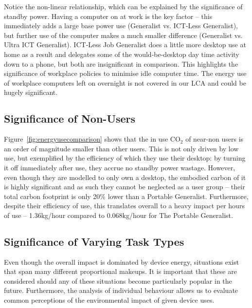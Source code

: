 \documentclass[conference]{IEEEtran}
\begin{document}
Notice the non-linear relationship, which can be
explained by the significance of standby power. Having a computer on
at work is the key factor -- this immediately adds a large base power
use (Generalist vs. ICT-Less Generalist), but further use of the
computer makes a much smaller difference (Generalist vs. Ultra ICT
Generalist). ICT-Less Job Generalist does a little more desktop use at
home as a result and delegates some of the would-be-desktop day time
activity down to a phone, but both are insignificant in
comparison. This highlights the significance of workplace policies to
minimise idle computer time. The energy use of workplace computers
left on overnight is not covered in our LCA and could be hugely
significant.

\subsection{Significance of Non-Users}

Figure~\ref{fig:energyusecomparison} shows that the in use CO$_2$ of
near-non users is an order of magnitude smaller than other users. This
is not only driven by low use, but exemplified by the efficiency of
which they use their desktop: by turning it off immediately after use,
they accrue no standby power wastage. However, even though they are
modelled to only own a desktop, the embodied carbon of it is highly
significant and as such they cannot be neglected as a user group --
their total carbon footprint is only 20\% lower than a Portable
Generalist. Furthermore, despite their efficiency of use, this
translates overall to a heavy impact per hours of use -- 1.36kg/hour
compared to 0.068kg/hour for The Portable Generalist.

\subsection{Significance of Varying Task Types}

Even though the overall impact is dominated by device energy,
situations exist that span many different proportional makeups. It is
important that these are considered should any of these situations
become particularly popular in the future. Furthermore, the analysis
of individual behaviour allows us to evaluate common perceptions of
the environmental impact of given device uses.
\end{document}
